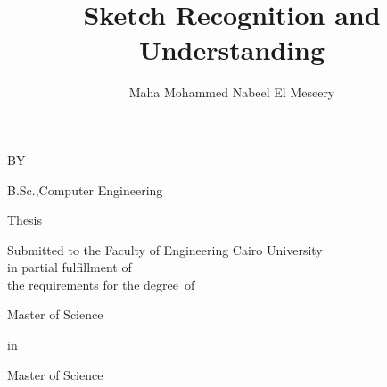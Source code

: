 \documentclass[11pt,doublespace]{report}%
\begin{document}


   \vspace*{0.375in}
               {\Large\bf\title{Sketch Recognition and Understanding}  }
                                 \vspace*{0.375in}
           
                                \vspace*{\fill}\par
                                      BY
                                \vspace*{\fill}\par
                               {\Large \author{Maha Mohammed Nabeel El Meseery }}
                                     \par
                               B.Sc.,Computer  Engineering
                                \vspace*{\fill}\par
                                    Thesis
                                \vspace*{\fill}\par
                           Submitted to the Faculty of Engineering Cairo University\\
                         in partial fulfillment of \\
                   the requirements for the degree\ of
                                \vspace*{\fill}\par
                                   Master of Science
                                     \par
                                      in
                                     \par
                                   Master of Science
                                \vspace*{\fill}\par
                        
\end{document}
